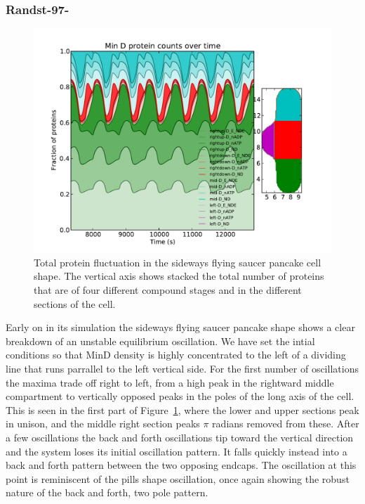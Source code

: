 \documentclass[letterpaper,twocolumn,amsmath,amssymb,pre]{revtex4-1}
\begin{document}
\subsubsection{Randst-97-}
\begin{figure}
  \includegraphics[width=\columnwidth]{../data/shape-randst/plots/box-plot_D--randst-25-800-600-9700-1500}
  \caption{Total protein fluctuation in the sideways flying saucer
    pancake cell shape.  The vertical axis shows stacked the total
    number of proteins that are of four different compound stages and
    in the different sections of the cell.}
  \label{box-97}
\end{figure}

Early on in its simulation the sideways flying saucer pancake shape
shows a clear breakdown of an unstable equilibrium oscillation.  We
have set the intial conditions so that MinD density is highly
concentrated to the left of a dividing line that runs parrallel to the
left vertical side.  For the first number of oscillations the maxima
trade off right to left, from a high peak in the rightward middle
compartment to vertically opposed peaks in the poles of the long axis
of the cell.  This is seen in the first part of Figure~\ref{box-97},
where the lower and upper sections peak in unison, and the middle
right section peaks $\pi$ radians removed from these.  After a few
oscillations the back and forth oscillations tip toward the vertical
direction and the system loses its initial oscillation pattern.  It
falls quickly instead into a back and forth pattern between the two
opposing endcaps.  The oscillation at this point is reminiscent of the
pills shape oscillation, once again showing the robust nature of the
back and forth, two pole pattern.
\end{document}
